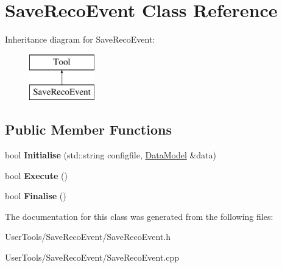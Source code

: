 \hypertarget{classSaveRecoEvent}{\section{Save\-Reco\-Event Class Reference}
\label{classSaveRecoEvent}
}
Inheritance diagram for Save\-Reco\-Event\-:\begin{figure}[H]
\begin{center}
\leavevmode
\includegraphics[height=2.000000cm]{classSaveRecoEvent}
\end{center}
\end{figure}
\subsection*{Public Member Functions}
\begin{DoxyCompactItemize}
\item 
\hypertarget{classSaveRecoEvent_ace0d320627ceb6057ad19fc8863e717e}{bool {\bfseries Initialise} (std\-::string configfile, \hyperlink{classDataModel}{Data\-Model} \&data)}\label{classSaveRecoEvent_ace0d320627ceb6057ad19fc8863e717e}

\item 
\hypertarget{classSaveRecoEvent_a6ee4a4bbf889fd92c8452c6464f36395}{bool {\bfseries Execute} ()}\label{classSaveRecoEvent_a6ee4a4bbf889fd92c8452c6464f36395}

\item 
\hypertarget{classSaveRecoEvent_a28a07f2ead5d5e1aa21f0b6ed9b4ab83}{bool {\bfseries Finalise} ()}\label{classSaveRecoEvent_a28a07f2ead5d5e1aa21f0b6ed9b4ab83}

\end{DoxyCompactItemize}


The documentation for this class was generated from the following files\-:\begin{DoxyCompactItemize}
\item 
User\-Tools/\-Save\-Reco\-Event/Save\-Reco\-Event.\-h\item 
User\-Tools/\-Save\-Reco\-Event/Save\-Reco\-Event.\-cpp\end{DoxyCompactItemize}
